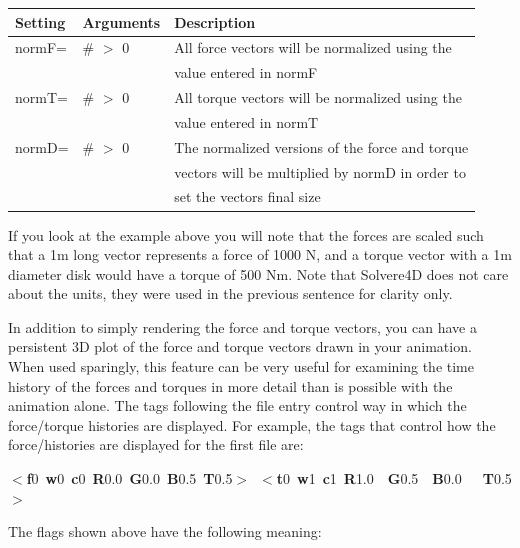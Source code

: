 \documentclass[singlecolumn,12pt]{article}
\newcommand{\hlstd}[1]{\textcolor[rgb]{0,0,0}{#1}}
\newcommand{\hlkey}[1]{\textcolor[rgb]{0,0,1}{\bf{#1}}}
\newcommand{\hlnum}[1]{\textcolor[rgb]{0.66,0,0.66}{#1}}
\begin{document}
\vspace{1cm}
\begin{tabular}{l l l}
\hline Setting & Arguments  & Description \\
\hline normF= & \# $>$ 0 & All force vectors will be normalized using the\\
    &           & value entered in normF\\
normT= & \# $>$ 0 & All torque vectors will be normalized using the\\
    &           & value entered in normT\\
normD= & \# $>$ 0 & The normalized versions of the force and torque\\
        &       & vectors will be multiplied by normD in order to\\
        &       & set the vectors final size
\end{tabular}
\vspace{1cm}

 If you look at the example above you will note that the
forces are scaled such that a 1m long vector represents a force of
1000 N, and a torque vector with a 1m diameter disk would have a
torque of 500 Nm. Note that Solvere4D does not care about the units,
they were used in the previous sentence for clarity only.

In addition to simply rendering the force and torque vectors, you
can have a persistent 3D plot of the force and torque vectors drawn
in your animation. When used sparingly, this feature can be very
useful for examining the time history of the forces and torques in
more detail than is possible with the animation alone. The tags
following the file entry control way in which the force/torque
histories are displayed. For example, the tags that control how the
force/histories are displayed for the first file are:

\vspace{1cm} \hlkey{$<$f}\hlnum{0\ }\hlkey{w}\hlnum{0\
}\hlkey{c}\hlnum{0\ }\hlkey{R}\hlnum{0.0\ }\hlkey{G}\hlnum{0.0\
}\hlkey{B}\hlnum{0.5\ }\hlkey{T}\hlnum{0.5}\hlkey{$>$}\hlstd{\
}\hlkey{$<$t}\hlnum{0\ }\hlkey{w}\hlnum{1\ }\hlkey{c}\hlnum{1\
}\hlkey{R}\hlnum{1.0\ \ }\hlkey{G}\hlnum{0.5\ \
}\hlkey{B}\hlnum{0.0\ \ \ }\hlkey{T}\hlnum{0.5}\hlkey{$>$}
\vspace{1cm}

The flags shown above have the following meaning:
\end{document}
